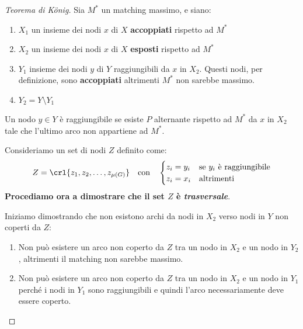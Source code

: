 \documentclass[\main/main.tex]{subfiles}
\begin{document}
\begin{proof}[Teorema di König]
	Sia \(M^*\) un matching massimo, e siano:
	\begin{enumerate}
		\item \(X_1\) un insieme dei nodi \(x\) di \(X\) \textbf{accoppiati} rispetto ad \(M^*\)
		\item \(X_2\) un insieme dei nodi \(x\) di \(X\) \textbf{esposti} rispetto ad \(M^*\)
		\item \(Y_1\) insieme dei nodi \(y\) di \(Y\) raggiungibili da \(x\) in \(X_2\). Questi nodi, per definizione, sono \textbf{accoppiati} altrimenti \(M^*\) non sarebbe massimo.
		\item \(Y_2 = Y \setminus Y_1\)
	\end{enumerate}

	\begin{center}
		\begin{minipage}{0.618\textwidth}
			\begin{definition}
				Un nodo \(y \in Y\) è raggiungibile se esiste \(P\) alternante rispetto ad \(M^*\) da \(x\) in \(X_2\) tale che l'ultimo arco non appartiene ad \(M^*\).
			\end{definition}
		\end{minipage}
	\end{center}

	Consideriamo un set di nodi \(Z\) definito come:
	\[
		Z = \crl{z_1, z_2, \ldots, z_{\mu(G)}} \quad \text{con} \quad \begin{cases}
			z_i = y_i & \text{se \(y_i\) è raggiungibile} \\
			z_i = x_i & \text{altrimenti}
		\end{cases}
	\]
	\textbf{Procediamo ora a dimostrare che il set \(Z\) è \textit{trasversale}}.

	Iniziamo dimostrando che non esistono archi da nodi in \(X_2\) verso nodi in \(Y\) non coperti da \(Z\):

	\begin{enumerate}
		\item Non può esistere un arco non coperto da \(Z\) tra un nodo in \(X_2\) e un nodo in \(Y_2\), altrimenti il matching non sarebbe massimo.
		\item Non può esistere un arco non coperto da \(Z\) tra un nodo in \(X_2\) e un nodo in \(Y_1\) perché i nodi in \(Y_1\) sono raggiungibili e quindi l'arco necessariamente deve essere coperto.
	\end{enumerate}


\end{proof}
\end{document}
